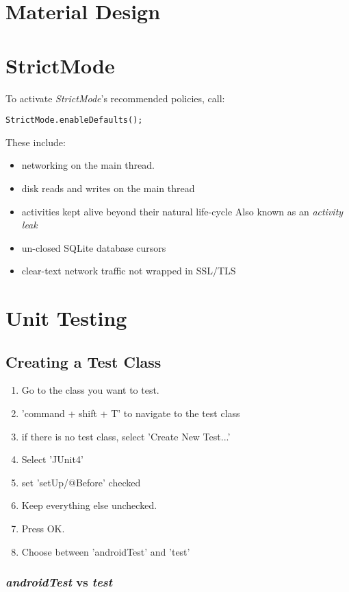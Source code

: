 \documentclass[]{article}
\renewcommand{\it}[1]{\textit{#1}}
\begin{document}
\section{Material Design}


\section{StrictMode}
To activate \it{StrictMode}'s recommended policies, call:
\begin{lstlisting}
StrictMode.enableDefaults();
\end{lstlisting}
These include:
\begin{itemize}
	\item networking on the main thread.
	\item disk reads and writes on the main thread
	\item activities kept alive beyond their natural life-cycle 
	\subitem Also known as an \it{activity leak}
	\item un-closed SQLite database cursors
	\item clear-text network traffic not wrapped in SSL/TLS
\end{itemize}

\section{Unit Testing}
\subsection{Creating a Test Class}
\begin{enumerate}
	\item Go to the class you want to test.
	\item 'command + shift + T' to navigate to the test class
	\item if there is no test class, select 'Create New Test...'
	\item Select 'JUnit4'
	\item set 'setUp/@Before' checked
	\item Keep everything else unchecked.
	\item Press OK.
	\item Choose between 'androidTest' and 'test'
\end{enumerate}
\subsubsection{\textit{androidTest} vs \textit{test}}
\end{document}
